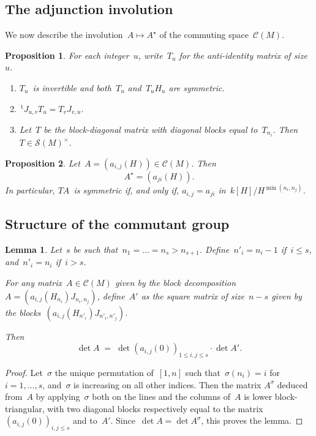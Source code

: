 \documentclass{article}%
\newtheorem{prop}{Proposition}
\newtheorem{lem}{Lemma}
\let\ro\mathscr
\def\transpose{\,{}^{\mathrm{t}\!}}
\begin{document}
\subsection{The adjunction involution}%

We now describe the involution~$A ↦ A^{⋆}$ of the commuting space~$\ro
C(M)$.

\begin{prop}\label{prop:big-T}
For each integer~$u$, write~$T_u$ for the anti-identity matrix of
size~$u$.
\begin{enumerate}
\item $T_u$~is invertible and both~$T_u$ and~$T_u H_u$ are symmetric.
\item $\transpose{J_{u,v}} T_u = T_v J_{v,u}$.
\item Let~$T$ be the block-diagonal matrix with diagonal blocks equal
to~$T_{n_i}$. Then $T ∈ \ro S(M)^{×}$.
\end{enumerate}
\end{prop}


\begin{prop}
Let~$A = (a_{i,j}(H)) ∈ \ro C(M)$. Then \[ A^{⋆} = (a_{ji}(H)). \]
In particular, $TA$~is symmetric if, and only if, $a_{i,j} = a_{ji}$
in~$k[H]/H^{\min (n_i, n_j)}$.
\end{prop}

\subsection{Structure of the commutant group}%


\begin{lem}\label{lem:det-1block}
Let~$s$ be such that~$n_1 = … = n_s > n_{s+1}$.
Define~$n'_i = n_i - 1$ if~$i ≤ s$, and~$n'_i = n_i$ if~$i > s$.

For any matrix~$A ∈ \ro C(M)$ given by the block decomposition~$A =
(a_{i,j}(H_{n_i}) J_{n_i,n_j})$, define~$A'$ as the square matrix of
size~$n - s$ given by the blocks~$(a_{i,j}(H_{n'_i}) J_{n'_i,
n'_j})$.

Then \[ \det A \;=\; \det (a_{i,j}(0))_{1 ≤ i,j ≤ s} · \det A'. \]
\end{lem}


\begin{proof}
Let~$σ$ the unique permutation of~$[1,n]$ such that~$σ(n_i) = i$ for~$i =
1, …, s$, and~$σ$ is increasing on all other indices. Then the matrix
$A^{σ}$ deduced from~$A$ by applying~$σ$ both on the lines and the
columns of~$A$ is lower block-triangular, with two diagonal blocks
respectively equal to the matrix~$(a_{i,j}(0))_{i,j ≤ s}$ and to~$A'$.
Since~$\det A = \det A^{σ}$, this proves the lemma.
\end{proof}
\end{document}

